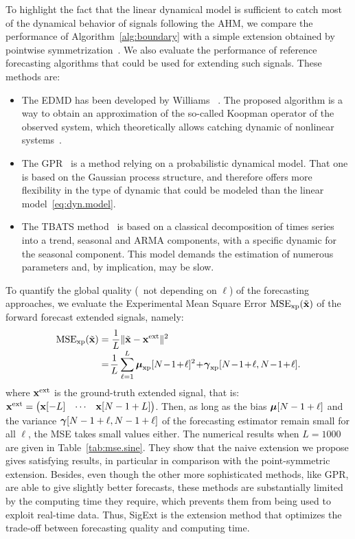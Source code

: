 To highlight the fact that the linear dynamical model is sufficient to catch most of the dynamical behavior of signals following the AHM, we compare the performance of Algorithm~\ref{alg:boundary} with a simple extension obtained by pointwise symmetrization~\cite{Kharitonenko02wavelet}. We also evaluate the performance of reference forecasting algorithms that could be used for extending such signals. These methods are:
\begin{itemize}
\item The EDMD has been developed by Williams \etal~\cite{Williams15data}. The proposed algorithm is a way to obtain an approximation of the so-called Koopman operator of the observed system, which theoretically allows catching dynamic of nonlinear systems~\cite{Korda18linear}.
\item The GPR~\cite{Rasmussen06gaussian} is a method relying on a probabilistic dynamical model. That one is based on the Gaussian process structure, and therefore offers more flexibility in the type of dynamic that could be modeled than the linear model~\eqref{eq:dyn.model}.
\item The TBATS method~\cite{DeLivera11forecasting} is based on a classical decomposition of times series into a trend, seasonal and ARMA components, with a specific dynamic for the seasonal component. This model demands the estimation of numerous parameters and, by implication, may be slow. 
\end{itemize}

To quantify the global quality (\ie~not depending on $\ell$) of the forecasting approaches, we evaluate the Experimental Mean Square Error $\mathrm{MSE_{xp}}(\tilde{{\mathbf x}})$ of the forward forecast extended signals, namely:
\begin{align}
\label{eq:mse}
\mathrm{MSE_{\xp}}(\tilde\bx) &= \dfrac1{L}\|\tilde\bx -\bx^\mathrm{ext}\|^2 \\[-1mm]
\nonumber
&=\! \dfrac1{L}\sum_{\ell=1}^L \bmu_{\xp}[N\!-\!1\!+\!\ell]^2 \!+\! \bgamma_{\xp}[N\!-\!1\!+\!\ell,N\!-\!1\!+\!\ell] .
\end{align}
where ${\mathbf x}^\mathrm{ext}$ is the ground-truth extended signal, that is: ${\mathbf x}^\mathrm{ext} = \begin{pmatrix}{\mathbf x}[-L] & \cdots & {\mathbf x}[N-1+L] \end{pmatrix}$. Then, as long as the bias $\boldsymbol{\mu}[N-1+\ell]$ and the variance $\boldsymbol{\gamma}[N-1+\ell,N-1+\ell]$ of the forecasting estimator remain small for all $\ell$, the MSE takes small values either. The numerical results when $L=1000$ are given in Table~\ref{tab:mse.sine}. They show that the naive extension we propose gives satisfying results, in particular in comparison with the point-symmetric extension. Besides, even though the other more sophisticated methods, like GPR, are able to give slightly better forecasts, these methods are substantially limited by the computing time they require, which prevents them from being used to exploit real-time data. Thus, {\sf SigExt} is the extension method that optimizes the trade-off between forecasting quality and computing time.

